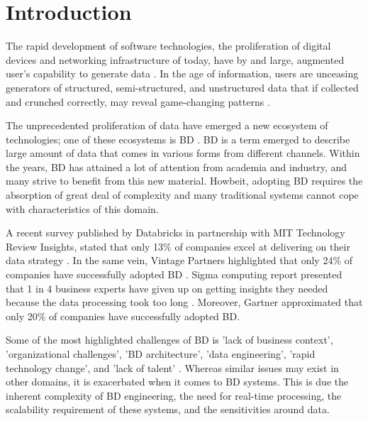 \documentclass{ieeeaccess}
\begin{document}
\titlepgskip=-15pt

\maketitle

\section{Introduction}

The rapid development of software technologies, the proliferation of digital devices and networking infrastructure of today, have by and large, augmented user’s capability to generate data \cite{AtaeiSecurity}. In the age of information, users are unceasing generators of structured, semi-structured, and unstructured data that if collected and crunched correctly, may reveal game-changing patterns \cite{AtaeiACIS}.

The unprecedented proliferation of data have emerged a new ecosystem of technologies; one of these ecosystems is BD \cite{AtaeiHype}. BD is a term emerged to describe large amount of data that comes in various forms from different channels. Within the years, BD has attained a lot of attention from academia and industry, and many strive to benefit from this new material. Howbeit, adopting BD requires the absorption of great deal of complexity and many traditional systems cannot cope with characteristics of this domain. 

A recent survey published by Databricks in partnership with MIT Technology Review Insights, stated that only 13\% of companies excel at delivering on their data strategy \cite{DataBricksSurvey}. In the same vein, Vintage Partners highlighted that only 24\% of companies have successfully adopted BD \cite{NewVantageSurvey}. Sigma computing report presented that 1 in 4 business experts have given up on getting insights they needed because the data processing took too long \cite{SigmaSurvey}. Moreover, Gartner approximated that only 20\% of companies have successfully adopted BD. 

Some of the most highlighted challenges of BD is 'lack of business context', 'organizational challenges', 'BD architecture', 'data engineering', 'rapid technology change', and 'lack of talent' \cite{AtaeiBigDataEnvirons}. Whereas similar issues may exist in other domains, it is exacerbated when it comes to BD systems. This is due the inherent complexity of BD engineering, the need for real-time processing, the scalability requirement of these systems, and the sensitivities around data.
\end{document}

